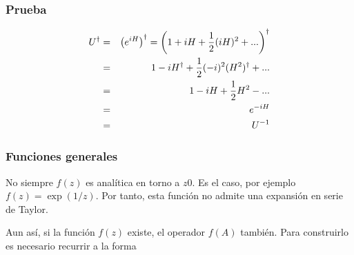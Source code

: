 \documentclass[letterpaper,10pt,english]{jupyterBook}
\begin{document}
\subsubsection*{Prueba}
\label{equation:docs/Part_01_Formalismo/Chapter_01_02_Formalismo_matemático/01_03_Operadores_myst:1fb45fb7-58be-45b7-9f0d-07b58bd34f97}\begin{eqnarray}
U^\dagger &=& \left( e^{iH}\right)^\dagger = \left( 1+ iH + \frac{1}{2}(i H)^2 + ...\right)^\dagger \\
&=& 1 - iH^\dagger  + \frac{1}{2}(-i)^2 (H^2)^\dagger + ... \\
&=& 1 - iH +\frac{1}{2} H^2 - ... \\
&=& e^{-iH}\\ \rule{0mm}{6mm}
&=& U^{-1}
\end{eqnarray}

\subsubsection{Funciones  generales}
\label{\detokenize{docs/Part_01_Formalismo/Chapter_01_02_Formalismo_matem_xe1tico/01_03_Operadores_myst:funciones-generales}}
\sphinxAtStartPar
No siempre \(f(z)\) es analítica en torno a \(z0\). Es el caso,  por ejemplo \(f(z) = \exp(1/z)\). Por tanto, esta función no admite una expansión en serie de Taylor.

\sphinxAtStartPar
Aun así, si la función \(f(z)\) existe,  el operador \(f(A)\)  también. Para construirlo es necesario recurrir a la forma 
\end{document}
